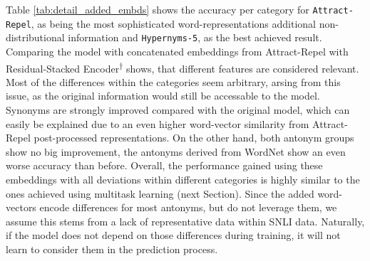 Table \ref{tab:detail_added_embds} shows the accuracy per category for \texttt{Attract-Repel}, as being the most sophisticated word-representations additional non-distributional information and \texttt{Hypernyms-5}, as the best achieved result. Comparing the model with concatenated embeddings from Attract-Repel with Residual-Stacked Encoder\textsuperscript{$\dagger$} shows, that different features are considered relevant. Most of the differences within the categories seem arbitrary, arsing from this issue, as the original information would still be accessable to the model. Synonyms are strongly improved compared with the original model, which can easily be explained due to an even higher word-vector similarity from Attract-Repel post-processed representations. On the other hand, both antonym groups show no big improvement, the antonyms derived from WordNet show an even worse accuracy than before. Overall, the performance gained using these embeddings with all deviations within different categories is highly similar to the ones achieved using multitask learning (next Section). Since the added word-vectors encode differences for most antonyms, but do not leverage them, we assume this stems from a lack of representative data within \ac{SNLI} data. Naturally, if the model does not depend on those differences during training, it will not learn to consider them in the prediction process.

